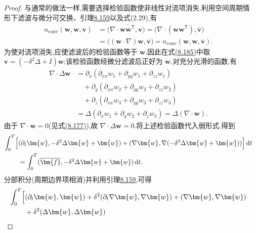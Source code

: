 \begin{proof}
与通常的做法一样,需要选择检验函数使非线性对流项消失.利用空间周期情形下滤波与微分可交换、引理\hyperref[lem:les-filter-selfadjoint]{8.159}以及式(2.29),有
\[
\begin{aligned}
 n_{\mathrm{conv}}(\bm{w},\bm{w},\bm{v})
 &=\bigl(\nabla\cdot\overline{\bm{w}\bm{w}^{\mathsf T}},
          \bm{v}\bigr)
  =\bigl(\nabla\cdot(\bm{w}\bm{w}^{\mathsf T}),
          \overline{\bm{v}}\bigr)\\
 &=\bigl((\bm{w}\cdot\nabla)\bm{w},
          \overline{\bm{v}}\bigr)
  =n_{\mathrm{conv}}(\bm{w},\bm{w},
          \overline{\bm{v}}).
\end{aligned}
\]
为使对流项消失,应使滤波后的检验函数等于 $\bm{w}$.因此在式\hyperref[eq:les-adm-lowest-order-weak-form]{(8.185)}中取
$\bm{v}=(-\delta^2\Delta+I)\bm{w}$;该检验函数经微分滤波后正好为 $\bm{w}$.对充分光滑的函数,有
\begin{equation}\label{eq:les-adm-divergence-filter-commutation}
\begin{aligned}
 \nabla\cdot\Delta\bm{w}
 &=\partial_x(\partial_{xx}w_1+\partial_{yy}w_1+\partial_{zz}w_1)\\
 &\quad+\partial_y(\partial_{xx}w_2+\partial_{yy}w_2+\partial_{zz}w_2)\\
 &\quad+\partial_z(\partial_{xx}w_3+\partial_{yy}w_3+\partial_{zz}w_3)\\
 &=\Delta(\partial_xw_1+\partial_yw_2+\partial_zw_3)
  =\Delta(\nabla\cdot\bm{w}).
\end{aligned}
\end{equation}
由于 $\nabla\cdot\bm{w}=0$(见式\hyperref[eq:les-adm-model]{(8.177)}),故
$\nabla\cdot\Delta\bm{w}=0$.将上述检验函数代入弱形式,得到
\[
\begin{aligned}
 \int_0^T\Bigl[
  &(\partial_t\bm{w},
    -\delta^2\Delta\bm{w}+\bm{w})
   +(\nabla\bm{w},
     \nabla(-\delta^2\Delta\bm{w}+\bm{w}))
 \Bigr]\,\mathrm{d}t\\
 &=\int_0^T
   (\overline{\bm{f}},
    -\delta^2\Delta\bm{w}+\bm{w})\,\mathrm{d}t.
\end{aligned}
\]
分部积分(周期边界项相消)并利用引理\hyperref[lem:les-filter-selfadjoint]{8.159},可得
\begin{equation}\label{eq:les-adm-zero-order-energy-intermediate}
\begin{aligned}
 \int_0^T\Bigl[
  &(\partial_t\bm{w},\bm{w})
   +\delta^2(\partial_t\nabla\bm{w},\nabla\bm{w})
   +(\nabla\bm{w},\nabla\bm{w})\\
  &+\delta^2(\Delta\bm{w},\Delta\bm{w})

\end{aligned}
\end{equation}
\end{proof}
